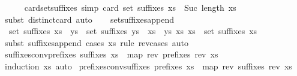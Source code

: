 \begin{isabellebody}
\isanewline
%
\endisadelimproof
\ \ \ \ \isanewline
{}\isamarkupfalse%
\ card{\isacharunderscore}set{\isacharunderscore}suffixes\ {\isacharbrackleft}simp{\isacharbrackright}{\isacharcolon}\ {\isachardoublequoteopen}card\ {\isacharparenleft}set\ {\isacharparenleft}suffixes\ xs{\isacharparenright}{\isacharparenright}\ {\isacharequal}\ Suc\ {\isacharparenleft}length\ xs{\isacharparenright}{\isachardoublequoteclose}\isanewline
%
\isadelimproof
\ \ %
\endisadelimproof
%
\isatagproof
{}\isamarkupfalse%
\ {\isacharparenleft}subst\ distinct{\isacharunderscore}card{\isacharparenright}\ auto%
\endisatagproof
{\isafoldproof}%
%
\isadelimproof
\isanewline
%
\endisadelimproof
\ \ \isanewline
{}\isamarkupfalse%
\ set{\isacharunderscore}suffixes{\isacharunderscore}append{\isacharcolon}\ \isanewline
\ \ {\isachardoublequoteopen}set\ {\isacharparenleft}suffixes\ {\isacharparenleft}xs\ {\isacharat}\ ys{\isacharparenright}{\isacharparenright}\ {\isacharequal}\ set\ {\isacharparenleft}suffixes\ ys{\isacharparenright}\ {\isasymunion}\ {\isacharbraceleft}xs{\isacharprime}\ {\isacharat}\ ys\ {\isacharbar}xs{\isacharprime}{\isachardot}\ xs{\isacharprime}\ {\isasymin}\ set\ {\isacharparenleft}suffixes\ xs{\isacharparenright}{\isacharbraceright}{\isachardoublequoteclose}\isanewline
%
\isadelimproof
\ \ %
\endisadelimproof
%
\isatagproof
{}\isamarkupfalse%
\ {\isacharparenleft}subst\ suffixes{\isacharunderscore}append{\isacharcomma}\ cases\ xs\ rule{\isacharcolon}\ rev{\isacharunderscore}cases{\isacharparenright}\ auto%
\endisatagproof
{\isafoldproof}%
%
\isadelimproof
\isanewline
%
\endisadelimproof
\isanewline
\isanewline
{}\isamarkupfalse%
\ suffixes{\isacharunderscore}conv{\isacharunderscore}prefixes{\isacharcolon}\ {\isachardoublequoteopen}suffixes\ xs\ {\isacharequal}\ map\ rev\ {\isacharparenleft}prefixes\ {\isacharparenleft}rev\ xs{\isacharparenright}{\isacharparenright}{\isachardoublequoteclose}\isanewline
%
\isadelimproof
\ \ %
\endisadelimproof
%
\isatagproof
{}\isamarkupfalse%
\ {\isacharparenleft}induction\ xs{\isacharparenright}\ auto%
\endisatagproof
{\isafoldproof}%
%
\isadelimproof
\isanewline
%
\endisadelimproof
\isanewline
{}\isamarkupfalse%
\ prefixes{\isacharunderscore}conv{\isacharunderscore}suffixes{\isacharcolon}\ {\isachardoublequoteopen}prefixes\ xs\ {\isacharequal}\ map\ rev\ {\isacharparenleft}suffixes\ {\isacharparenleft}rev\ xs{\isacharparenright}{\isacharparenright}{\isachardoublequoteclose}\isanewline
%
\isadelimproof
\ \ %
\endisadelimproof
%
\isatagproof

\end{isabellebody}
